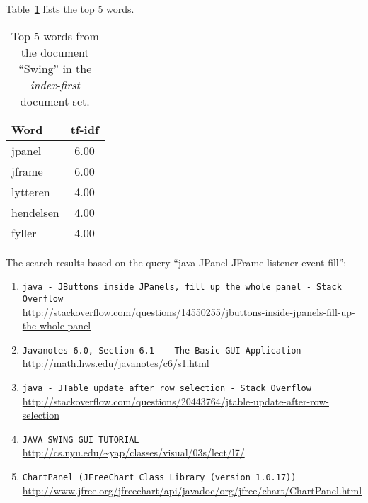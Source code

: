 Table~\ref{tab:topWords-no-swing-2} lists the top 5 words.
\begin{table}[H]
\centering
\begin{tabular}{|l|c|}
\hline\hline
    Word & tf-idf \\
\hline
    jpanel & 6.00 \\
    jframe & 6.00 \\
    lytteren & 4.00 \\
    hendelsen & 4.00 \\
    fyller & 4.00 \\
\hline\hline
\end{tabular}
\caption{Top 5 words from the document ``Swing'' in the \textit{index-first} document set.}
\label{tab:topWords-no-swing-2}
\end{table}

The search results based on the query ``java JPanel JFrame listener event fill'':

\begin{enumerate}
\item
    \verb|java - JButtons inside JPanels, fill up the whole panel - Stack Overflow| \\
    \url{http://stackoverflow.com/questions/14550255/jbuttons-inside-jpanels-fill-up-the-whole-panel}
\item
    \verb|Javanotes 6.0, Section 6.1 -- The Basic GUI Application| \\
    \url{http://math.hws.edu/javanotes/c6/s1.html}
\item
    \verb|java - JTable update after row selection - Stack Overflow| \\
    \url{http://stackoverflow.com/questions/20443764/jtable-update-after-row-selection}
\item
    \verb|JAVA SWING GUI TUTORIAL| \\
    \url{http://cs.nyu.edu/~yap/classes/visual/03s/lect/l7/}
\item
    \verb|ChartPanel (JFreeChart Class Library (version 1.0.17))| \\
    \url{http://www.jfree.org/jfreechart/api/javadoc/org/jfree/chart/ChartPanel.html}
\end{enumerate}

